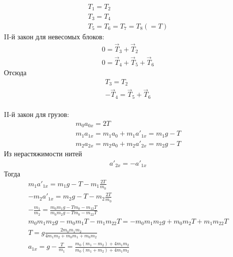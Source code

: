 \documentclass[a5paper,10pt]{article}\usepackage[usenames,dvipsnames]{color}\usepackage{extsizes,cmap,graphicx,misccorr,indentfirst,makecell,multirow,ulem,geometry,amssymb,amsfonts,amsmath,amsthm,titlesec,float,fancyhdr,wrapfig,tikz}\usepackage[T2A]{fontenc}\usepackage[utf8x]{inputenc}\usepackage[english, russian]{babel}\usetikzlibrary{decorations.pathreplacing,decorations.pathmorphing,patterns,calc,scopes,arrows,through,positioning,shapes.misc}\graphicspath{{img/}}\linespread{1.3}\frenchspacing\geometry{left=1cm, right=1cm, top=2cm, bottom=1cm, bindingoffset=0cm}\pagestyle{fancy}\fancyhead{}\fancyhead[R]{Сарафанов Ф.Г.}
\begin{document}
\hfill
\begin{gather*}
    T_1=T_2\\
    T_3=T_4\\
    T_5=T_6=T_7=T_8(=T)
\end{gather*}
II-й закон для невесомых блоков:
\begin{gather*}
    0=\vec{T}_3+\vec{T}_2\\
    0=\vec{T}_4+\vec{T}_5+\vec{T}_6
\end{gather*}
Отсюда 
\begin{gather*}
    T_3=T_2\\
    -\vec{T}_4=\vec{T}_5+\vec{T}_6
\end{gather*}
\\
II-й закон для грузов:
\begin{gather*}
    m_0a_{0x}=2T\\
    m_1a_{1x}=m_1a_0+m_1a'_{1x}=m_1g-T\\
    m_2a_{2x}=m_2a_0+m_2a'_{2x}=m_2g-T
\end{gather*}
Из нерастяжимости нитей
\begin{gather*}
    a'_{2x}=-a'_{1x}
\end{gather*}
Тогда
\begin{gather*}
    m_1a'_{1x}=m_1g-T-m_1\frac{2T}{m_0}\\
    -m_2a'_{1x}=m_2g-T-m_2\frac{2T}{m_0}\\
    -\frac{m_1}{m_2}=\frac{m_0m_1g-Tm_0-m_12T}{m_0m_2g-Tm_0-m_22T}\\
    m_0m_1m_2g-m_0m_1T-m_1m_22T=-m_0m_1m_2g+m_0m_2T+m_1m_22T\\
    T=g\frac{2m_0m_1m_2}{4m_1m_2+m_0m_1+m_0m_2}\\
    a_{1x}=g-\frac{T}{m_1}=\frac{m_0(m_1-m_2)+4m_1m_2}{m_0(m_1+m_2)+4m_1m_2}
\end{gather*}
\end{document}
